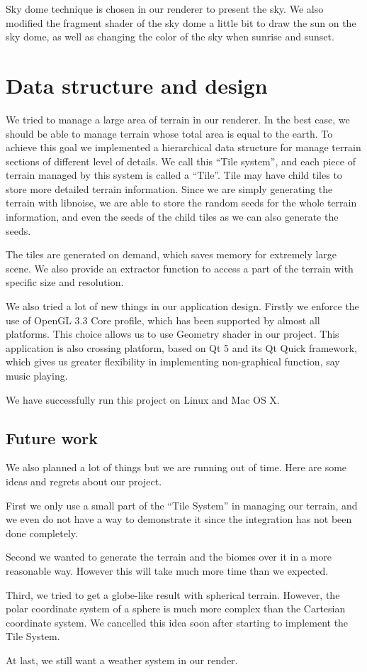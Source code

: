 \documentclass[10pt,twocolumn]{article}
\begin{document}
Sky dome technique is chosen in our renderer to present the sky. We also
modified the fragment shader of the sky dome a little bit to draw the sun on
the sky dome, as well as changing the color of the sky when sunrise and
sunset.

\section{Data structure and design}

We tried to manage a large area of terrain in our renderer. In the best case,
we should be able to manage terrain whose total area is equal to the earth.
To achieve this goal we implemented a hierarchical data structure for manage
terrain sections of different level of details. We call this ``Tile system'',
and each piece of terrain managed by this system is called a ``Tile''. Tile
may have child tiles to store more detailed terrain information. Since we are
simply generating the terrain with libnoise, we are able to store the random
seeds for the whole terrain information, and even the seeds of the child tiles
as we can also generate the seeds.

The tiles are generated on demand, which saves memory for extremely large
scene. We also provide an extractor function to access a part of the terrain
with specific size and resolution.

We also tried a lot of new things in our application design. Firstly we
enforce the use of OpenGL 3.3 Core profile, which has been supported by almost
all platforms. This choice allows us to use Geometry shader in our project.
This application is also crossing platform, based on Qt 5 and its Qt Quick
framework, which gives us greater flexibility in implementing non-graphical
function, say music playing.

We have successfully run this project on Linux and Mac OS X.

\subsection{Future work}

We also planned a lot of things but we are running out of time. Here are some
ideas and regrets about our project.

First we only use a small part of the ``Tile System'' in managing our terrain,
and we even do not have a way to demonstrate it since the integration has not
been done completely.

Second we wanted to generate the terrain and the biomes over it in a more
reasonable way. However this will take much more time than we expected.

Third, we tried to get a globe-like result with spherical terrain. However,
the polar coordinate system of a sphere is much more complex than the
Cartesian coordinate system. We cancelled this idea soon after starting to
implement the Tile System.

At last, we still want a weather system in our render.

{}

\end{document}
